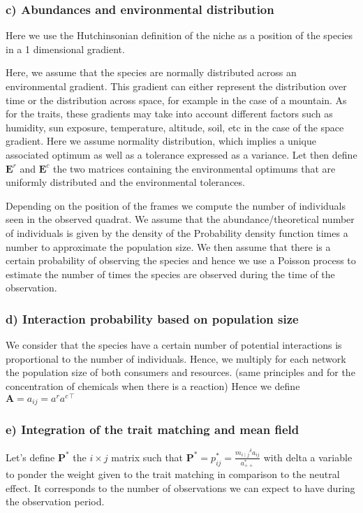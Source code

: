 \subsubsection{c) Abundances and environmental distribution}
Here we use the Hutchinsonian definition of the niche as a position of the species in a 1 dimensional gradient.

Here, we assume that the species are normally distributed across an environmental gradient. This gradient can either represent the distribution over time or the distribution across space, for example in the case of a mountain. As for the traits, these gradients may take into account different factors such as humidity, sun exposure, temperature, altitude, soil, etc in the case of the space gradient.
Here we assume normality distribution, which implies a unique associated optimum as well as a tolerance expressed as a variance. Let then define $\textbf{E}^r$ and $\textbf{E}^c$ the two matrices containing the environmental optimums that are uniformly distributed and the environmental tolerances.

Depending on the position of the frames we compute the number of individuals seen in the observed quadrat. We assume that the abundance/theoretical number of individuals is given by the density of the Probability density function times a number to approximate the population size. We then assume that there is a certain probability of observing the species and hence we use a Poisson process to estimate the number of times the species are observed during the time of the observation.


\subsubsection{d) Interaction probability based on population size}
We consider that the species have a certain number of potential interactions is proportional to the number of individuals. Hence, we multiply for each network the population size of both consumers and resources. (same principles and for the concentration of chemicals when there is a reaction)
Hence we define $\textbf{A} = a_{ij} = a^r a^{c\intercal}$




\subsubsection{e) Integration of the trait matching and mean field}
Let's define $\textbf{P}^*$ the $i \times j$ matrix such that $\textbf{P}^* = p^*_{ij} = \frac{{m_{i\mid j}}^\delta a_{ij}}{a_{++}^*}$ with delta a variable to ponder the weight given to the trait matching in comparison to the neutral effect.
It corresponds to the number of observations we can expect to have during the observation period.




